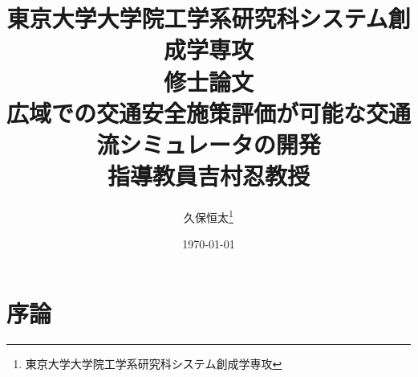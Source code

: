 \documentclass[14pt,a4j]{jsarticle}
\title{東京大学大学院工学系研究科システム創成学専攻 
\protect\\修士論文
\\広域での交通安全施策評価が可能な交通流シミュレータの開発
\\指導教員吉村忍教授}
\author{久保恒太\thanks{東京大学大学院工学系研究科システム創成学専攻}}
\date{\today}
\begin{document}
%
%
\maketitle
%
%
%
%
%
%
\newpage

\tableofcontents
\newpage

\section{序論}
\end{document}
